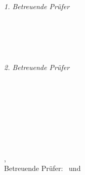 \begin{titlepage}
	\vfill
	\begin{minipage}[t]{.27\textwidth}
		\raggedleft
		\textit{1. Betreuende Prüfer}
	\end{minipage}
	\hspace*{15pt}
	\begin{minipage}[t]{.65\textwidth}
		{\Large \thesisFirstReviewer} \\
		{\small \thesisFirstReviewerDepartment} \\[-1mm]
		{\small \thesisFirstReviewerUniversity}
	\end{minipage} \\[5mm]
	\begin{minipage}[t]{.27\textwidth}
		\raggedleft
		\textit{2. Betreuende Prüfer}
	\end{minipage}
	\hspace*{15pt}
	\begin{minipage}[t]{.65\textwidth}
		{\Large \thesisSecondReviewer} \\
		{\small \thesisSecondReviewerDepartment} \\[-1mm]
		{\small \thesisSecondReviewerUniversity}
	\end{minipage} \\[10mm]
	
	\thesisDate \\
	
\end{titlepage}

\hfill
\vfill
{
	\small
	\textbf{\thesisName} \\
	\textit{\thesisTitle} \\
	\thesisSubject, \thesisDate \\
	Betreuende Prüfer: \thesisFirstReviewer\ und \thesisSecondReviewer \\[1.5em]
	\textbf{\thesisUniversity} \\
	\thesisUniversityDepartment \\
	\thesisUniversityStreetAddress \\
	\thesisUniversityPostalCode\  \thesisUniversityCity
}
